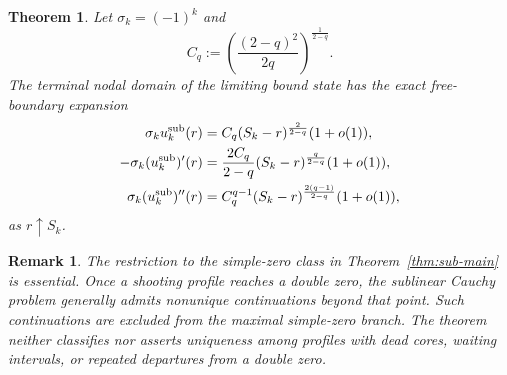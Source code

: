 \documentclass[11pt]{article}
\newtheorem{theorem}{Theorem}[section]
\newtheorem*{remark*}{Remark}
\begin{document}
\begin{theorem}
Let $\sigma_k=(-1)^k$ and
\begin{equation*}
 C_q:=\left(\frac{(2-q)^2}{2q}\right)^{\frac{1}{2-q}}.
\end{equation*}
The terminal nodal domain of the limiting bound state has the exact
free-boundary expansion
\begin{align}
 \sigma_k u_k^{\rm sub}(r)
 &=C_q(S_k-r)^{\frac{2}{2-q}}(1+o(1)),\label{eq:main-free-u}\\
 -\sigma_k (u_k^{\rm sub})'(r)
 &=\frac{2C_q}{2-q}(S_k-r)^{\frac{q}{2-q}}(1+o(1)),\label{eq:main-free-du}\\
 \sigma_k (u_k^{\rm sub})''(r)
 &=C_q^{q-1}(S_k-r)^{\frac{2(q-1)}{2-q}}(1+o(1)),\label{eq:main-free-ddu}
\end{align}
as $r\uparrow S_k$.
\end{theorem}


\begin{remark*}
{\rm The restriction to the simple-zero class in
Theorem~\ref{thm:sub-main} is essential. Once a shooting profile reaches a
double zero, the sublinear Cauchy problem generally admits nonunique
continuations beyond that point. Such continuations are excluded from the
maximal simple-zero branch. The theorem neither classifies nor asserts
uniqueness among profiles with dead cores, waiting intervals, or repeated
departures from a double zero.}
\end{remark*}
\end{document}
